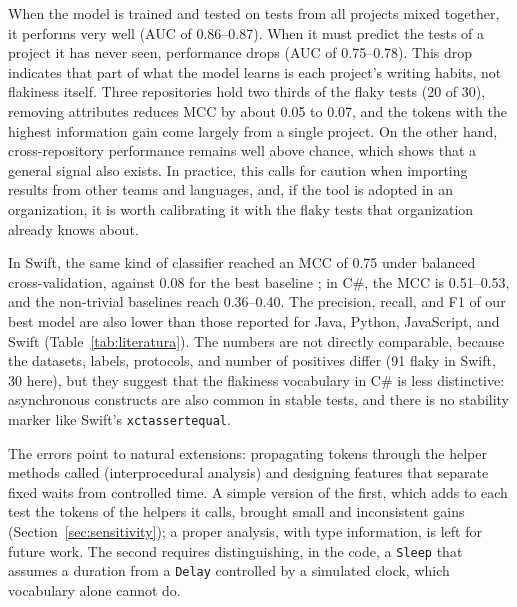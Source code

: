  When the model is trained and tested on tests from all projects mixed together, it performs very well (AUC of 0.86--0.87). When it must predict the tests of a project it has never seen, performance drops (AUC of 0.75--0.78). This drop indicates that part of what the model learns is each project's writing habits, not flakiness itself. Three repositories hold two thirds of the flaky tests (20 of 30), removing attributes reduces MCC by about 0.05 to 0.07, and the tokens with the highest information gain come largely from a single project. On the other hand, cross-repository performance remains well above chance, which shows that a general signal also exists. In practice, this calls for caution when importing results from other teams and languages, and, if the tool is adopted in an organization, it is worth calibrating it with the flaky tests that organization already knows about. 

 In Swift, the same kind of classifier reached an MCC of 0.75 under balanced cross-validation, against 0.08 for the best baseline \cite{medeiros2026vocabulary}; in C\#, the MCC is 0.51--0.53, and the non-trivial baselines reach 0.36--0.40. The precision, recall, and F1 of our best model are also lower than those reported for Java, Python, JavaScript, and Swift (Table~\ref{tab:literatura}). The numbers are not directly comparable, because the datasets, labels, protocols, and number of positives differ (91 flaky in Swift, 30 here), but they suggest that the flakiness vocabulary in C\# is less distinctive: asynchronous constructs are also common in stable tests, and there is no stability marker like Swift's \texttt{xctassertequal}.

 The errors point to natural extensions: propagating tokens through the helper methods called (interprocedural analysis) and designing features that separate fixed waits from controlled time. A simple version of the first, which adds to each test the tokens of the helpers it calls, brought small and inconsistent gains (Section~\ref{sec:sensitivity}); a proper analysis, with type information, is left for future work. The second requires distinguishing, in the code, a \texttt{Sleep} that assumes a duration from a \texttt{Delay} controlled by a simulated clock, which vocabulary alone cannot do.

